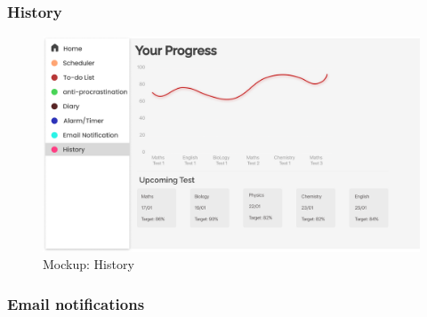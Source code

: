 \documentclass[a4paper]{article}
\begin{document}
\subsubsection{History}

\begin{figure}[H] %
	\centering %
	\includegraphics[width=1\textwidth]{./images/Mockup_History.png} %
	\caption*{Mockup: History} %
	\label{Fig.History} %
\end{figure}

\subsubsection{Email notifications}
\end{document}
